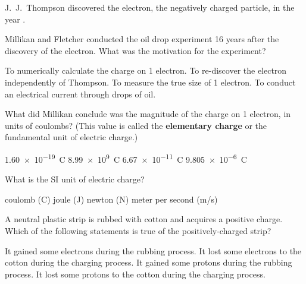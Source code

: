 \documentclass[]{exam}
\begin{document}
\begin{questions}
\question
J.~J.~Thompson discovered the electron, the negatively charged particle, in the year \fillin[1897].

\begin{randomizechoices}
\end{randomizechoices}

\question
Millikan and Fletcher conducted the oil drop experiment 16 years after the discovery of the electron. What was the motivation for the experiment?

\begin{randomizechoices}
    \correctchoice To numerically calculate the charge on 1 electron.
    \choice To re-discover the electron independently of Thompson.
    \choice To measure the true size of 1 electron.
    \choice To conduct an electrical current through drops of oil.
\end{randomizechoices}

\question
What did Millikan conclude was the magnitude of the charge on 1 electron, in units of coulombs? (This value is called the \textbf{elementary charge} or the fundamental unit of electric charge.)

\begin{randomizechoices}
    \correctchoice \SI{1.60e-19}{C}
    \choice \SI{8.99e9}{C}
    \choice \SI{6.67e-11}{C}
    \choice \SI{9.805e-6}{C}
\end{randomizechoices}

\question
What is the SI unit of electric charge?

\begin{randomizechoices}
\correctchoice coulomb (C)
\choice joule (J)
\choice newton (N)
\choice meter per second (m/s)
\end{randomizechoices}

\question
A neutral plastic strip is rubbed with cotton and acquires a positive charge. Which of the following statements is true of the positively-charged strip?

\begin{randomizechoices}
\choice It gained some electrons during the rubbing process.
\correctchoice It lost some electrons to the cotton during the charging process.
\choice It gained some protons during the rubbing process.
\choice It lost some protons to the cotton during the charging process.
\end{randomizechoices}




\end{questions}
\end{document}
